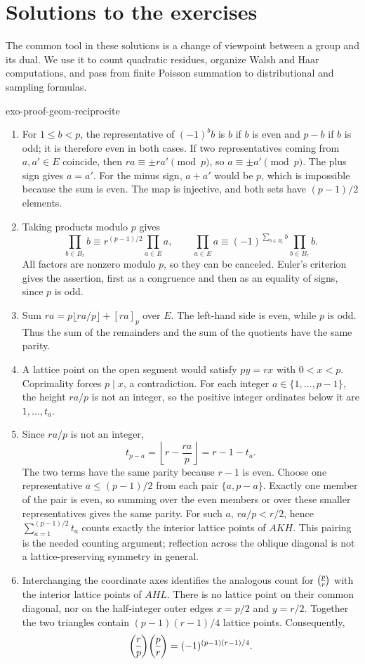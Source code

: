 \clearpage
\section{Solutions to the exercises}
\label{sec-solutions-2-duality}

The common tool in these solutions is a change of viewpoint between a group
and its dual. We use it to count quadratic residues, organize Walsh and Haar
computations, and pass from finite Poisson summation to distributional and
sampling formulas.

\begin{correction}{exo-proof-geom-reciprocite}
\begin{enumerate}
\item For $1\leq b<p$, the representative of $(-1)^bb$ is $b$ if $b$ is
even and $p-b$ if $b$ is odd; it is therefore even in both cases.
If two representatives coming from $a,a'\in E$ coincide, then
$ra\equiv\pm ra'\pmod p$, so $a\equiv\pm a'\pmod p$.
The plus sign gives $a=a'$. For the minus sign, $a+a'$ would be $p$,
which is impossible because the sum is even. The map is injective, and
both sets have $(p-1)/2$ elements.
\item Taking products modulo $p$ gives
\[
 \prod_{b\in B_r}b\equiv r^{(p-1)/2}\prod_{a\in E}a,
 \qquad
 \prod_{a\in E}a\equiv(-1)^{\sum_{b\in B_r}b}\prod_{b\in B_r}b.
\]
All factors are nonzero modulo $p$, so they can be canceled.
Euler's criterion gives the assertion, first as a congruence and then as an
equality of signs, since $p$ is odd.
\item Sum $ra=p\lfloor ra/p\rfloor+[ra]_p$ over $E$.
The left-hand side is even, while $p$ is odd. Thus the sum of the remainders
and the sum of the quotients have the same parity.
\item A lattice point on the open segment would satisfy $py=rx$ with
$0<x<p$. Coprimality forces $p\mid x$, a contradiction.
For each integer $a\in\{1,\ldots,p-1\}$, the height $ra/p$ is not an integer,
so the positive integer ordinates below it are $1,\ldots,t_a$.
\item Since $ra/p$ is not an integer,
\[
 t_{p-a}=\left\lfloor r-\frac{ra}{p}\right\rfloor=r-1-t_a.
\]
The two terms have the same parity because $r-1$ is even.
Choose one representative $a\leq(p-1)/2$ from each pair $\{a,p-a\}$.
Exactly one member of the pair is even, so summing over the even members
or over these smaller representatives gives the same parity.
For such $a$, $ra/p<r/2$, hence $\sum_{a=1}^{(p-1)/2}t_a$ counts exactly
the interior lattice points of $AKH$.
This pairing is the needed counting argument; reflection across the oblique
diagonal is not a lattice-preserving symmetry in general.
\item Interchanging the coordinate axes identifies the analogous count for
$\legsymb pr$ with the interior lattice points of $AHL$.
There is no lattice point on their common diagonal, nor on the half-integer
outer edges $x=p/2$ and $y=r/2$. Together the two triangles contain
$(p-1)(r-1)/4$ lattice points. Consequently,
\[
 \legsymb rp\legsymb pr=(-1)^{(p-1)(r-1)/4}.
\]
\end{enumerate}
\end{correction}


